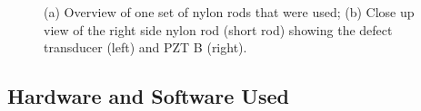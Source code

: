 \documentclass[11pt,letterpaper]{article}%
\begin{document}
   \begin{figure}
\begin{subfigmatrix}{2}
\end{subfigmatrix}
%
   \caption[all]
   { \label{tr_setup_3}
(a) Overview of one set of nylon rods that were used;
(b) Close up view of the right side nylon rod (short rod) showing the defect transducer (left) and PZT B (right).
 }
   \end{figure}

\subsection{Hardware and Software Used}
\label{hardware}
\end{document}

